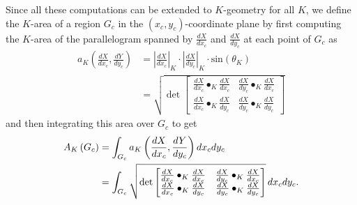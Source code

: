 \documentclass{ximera}
\begin{document}
Since all these computations can be extended to $K$-geometry for all
$K$, we define the $K$-area of a region $G_{c}$ in the $\left(
x_{c},y_{c}\right) $-coordinate plane by first computing the $K$-area
of the parallelogram spanned by $\frac{dX}{dx_{c}}$ and
$\frac{dX}{dy_{c}}$ at each point of $G_{c}$ as%
\begin{align*}
a_{K}\left(  \frac{dX}{dx_{c}},\frac{dY}{dy_{c}}\right) &=\left\vert
\frac{dX}{dx_{c}}\right\vert _{K}\cdot\left\vert \frac{dX}{dy_{c}}\right\vert
_{K}\cdot\mathrm{sin}\left(  \theta_{K}\right) \\
&  =\sqrt{\det
\begin{bmatrix}
\frac{dX}{dx_{c}}\bullet_{K}\frac{dX}{dx_{c}} & \frac{dX}{dy_{c}}\bullet
_{K}\frac{dX}{dx_{c}}\\
\frac{dX}{dx_{c}}\bullet_{K}\frac{dX}{dy_{c}} & \frac{dX}{dy_{c}}\bullet
_{K}\frac{dX}{dy_{c}}%
\end{bmatrix}}%
\end{align*}
and then integrating this area over $G_{c}$ to get%
\begin{align*}
A_{K}\left(  G_{c}\right) &=
\int_{G_{c}}
a_{K}\left(  \frac{dX}{dx_{c}},\frac{dY}{dy_{c}}\right)  dx_{c}dy_{c}\\
&  =%
\int_{G_{c}}
\sqrt{\det
\begin{bmatrix}
\frac{dX}{dx_{c}}\bullet_{K}\frac{dX}{dx_{c}} & \frac{dX}{dy_{c}}\bullet
_{K}\frac{dX}{dx_{c}}\\
\frac{dX}{dx_{c}}\bullet_{K}\frac{dX}{dy_{c}} & \frac{dX}{dy_{c}}\bullet
_{K}\frac{dX}{dy_{c}}%
\end{bmatrix}}\d x_{c}dy_{c}.
\end{align*}
\end{document}
